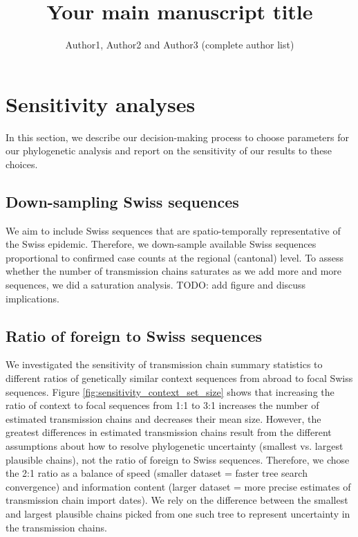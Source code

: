 \documentclass[9pt,twoside,lineno]{pnas-new}
\title{Your main manuscript title}
\author{Author1, Author2 and Author3 (complete author list)}
\begin{document}

\maketitle 

\SItext


\section{Sensitivity analyses}

In this section, we describe our decision-making process to choose parameters for our phylogenetic analysis and report on the sensitivity of our results to these choices. 

\subsection{Down-sampling Swiss sequences}
We aim to include Swiss sequences that are spatio-temporally representative of the Swiss epidemic. Therefore, we down-sample available Swiss sequences proportional to confirmed case counts at the regional (cantonal) level. To assess whether the number of transmission chains saturates as we add more and more sequences, we did a saturation analysis. TODO: add figure and discuss implications.

\subsection{Ratio of foreign to Swiss sequences}
We investigated the sensitivity of transmission chain summary statistics to different ratios of genetically similar context sequences from abroad to focal Swiss sequences. Figure \ref{fig:sensitivity_context_set_size} shows that increasing the ratio of context to focal sequences from 1:1 to 3:1 increases the number of estimated transmission chains and decreases their mean size. However, the greatest differences in estimated transmission chains result from the different assumptions about how to resolve phylogenetic uncertainty (smallest vs. largest plausible chains), not the ratio of foreign to Swiss sequences. Therefore, we chose the 2:1 ratio as a balance of speed (smaller dataset = faster tree search convergence) and information content (larger dataset = more precise estimates of transmission chain import dates). We rely on the difference between the smallest and largest plausible chains picked from one such tree to represent uncertainty in the transmission chains.
\end{document}
